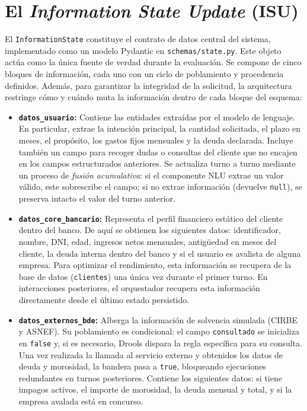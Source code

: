 \documentclass[12pt,a4paper]{report}
\begin{document}
\section{El \textit{Information State Update} (ISU)}

El \texttt{InformationState} constituye el contrato de datos central del sistema, implementado como un modelo Pydantic en \texttt{schemas/state.py}. Este objeto actúa como la única fuente de verdad durante la evaluación. Se compone de cinco bloques de información, cada uno con un ciclo de poblamiento y procedencia definidos. Además, para garantizar la integridad de la solicitud, la arquitectura restringe cómo y cuándo muta la información dentro de cada bloque del esquema:

\begin{itemize}
    \item \textbf{\texttt{datos\_usuario}:} Contiene las entidades extraídas por el modelo de lenguaje. En particular, extrae la intención principal, la cantidad solicitada, el plazo en meses, el propósito, los gastos fijos mensuales y la deuda declarada. Incluye también un campo para recoger dudas o consultas del cliente que no encajen en los campos estructurados anteriores. Se actualiza turno a turno mediante un proceso de \textit{fusión acumulativa}: si el componente NLU extrae un valor válido, este sobrescribe el campo; si no extrae información (devuelve \texttt{null}), se preserva intacto el valor del turno anterior.
    
    \item \textbf{\texttt{datos\_core\_bancario}:} Representa el perfil financiero estático del cliente dentro del banco. De aquí se obtienen los siguientes datos: identificador, nombre, DNI, edad, ingresos netos mensuales, antigüedad en meses del cliente, la deuda interna dentro del banco y si el usuario es avalista de alguna empresa. Para optimizar el rendimiento, esta información se recupera de la base de datos (\texttt{clientes}) una única vez durante el primer turno. En interacciones posteriores, el orquestador recupera esta información directamente desde el último estado persistido.
    
    \item \textbf{\texttt{datos\_externos\_bde}:} Alberga la información de solvencia simulada (CIRBE y ASNEF). Su poblamiento es condicional: el campo \texttt{consultado} se inicializa en \texttt{false} y, si es necesario, Drools dispara la regla específica para su consulta. Una vez realizada la llamada al servicio externo y obtenidos los datos de deuda y morosidad, la bandera pasa a \texttt{true}, bloqueando ejecuciones redundantes en turnos posteriores. Contiene los siguientes datos: si tiene impagos activos, el importe de morosidad, la deuda mensual y total, y si la empresa avalada está en concurso.
    

\end{itemize}
\end{document}
